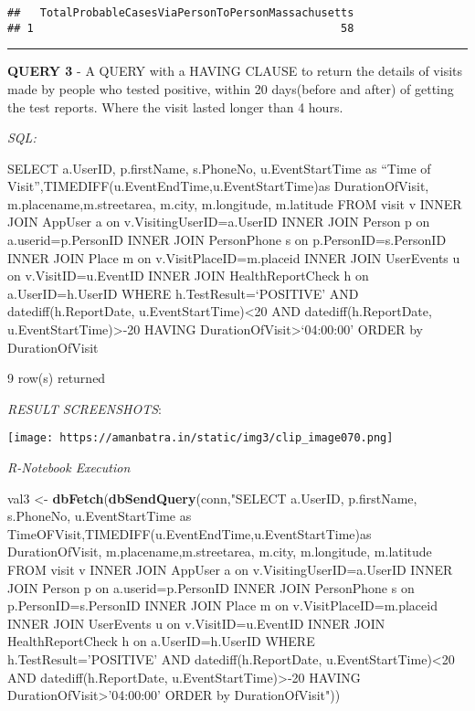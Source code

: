 \documentclass[
]{article}
\newenvironment{Shaded}{\begin{snugshade}}{\end{snugshade}}
\newcommand{\KeywordTok}[1]{\textcolor[rgb]{0.13,0.29,0.53}{\textbf{#1}}}
\newcommand{\NormalTok}[1]{#1}
\newcommand{\StringTok}[1]{\textcolor[rgb]{0.31,0.60,0.02}{#1}}
\begin{document}
\begin{verbatim}
##   TotalProbableCasesViaPersonToPersonMassachusetts
## 1                                               58
\end{verbatim}

\begin{center}\rule{0.5\linewidth}{0.5pt}\end{center}

\textbf{QUERY 3} - A QUERY with a HAVING CLAUSE to return the details of
visits made by people who tested positive, within 20 days(before and
after) of getting the test reports. Where the visit lasted longer than 4
hours.

\emph{SQL:}

SELECT a.UserID, p.firstName, s.PhoneNo, u.EventStartTime as ``Time of
Visit'',TIMEDIFF(u.EventEndTime,u.EventStartTime)as DurationOfVisit,
m.placename,m.streetarea, m.city, m.longitude, m.latitude FROM visit v
INNER JOIN AppUser a on v.VisitingUserID=a.UserID INNER JOIN Person p on
a.userid=p.PersonID INNER JOIN PersonPhone s on p.PersonID=s.PersonID
INNER JOIN Place m on v.VisitPlaceID=m.placeid INNER JOIN UserEvents u
on v.VisitID=u.EventID INNER JOIN HealthReportCheck h on
a.UserID=h.UserID WHERE h.TestResult=`POSITIVE' AND
datediff(h.ReportDate, u.EventStartTime)\textless20 AND
datediff(h.ReportDate, u.EventStartTime)\textgreater-20 HAVING
DurationOfVisit\textgreater{}`04:00:00' ORDER by DurationOfVisit

9 row(s) returned

\emph{RESULT SCREENSHOTS}:

\texttt{[image: https://amanbatra.in/static/img3/clip\_image070.png]}

\emph{R-Notebook Execution}

\begin{Shaded}
\begin{Highlighting}[]
\NormalTok{val3 <-}\StringTok{ }\KeywordTok{dbFetch}\NormalTok{(}\KeywordTok{dbSendQuery}\NormalTok{(conn,}\StringTok{"SELECT a.UserID, p.firstName, s.PhoneNo, u.EventStartTime as TimeOFVisit,TIMEDIFF(u.EventEndTime,u.EventStartTime)as DurationOfVisit, m.placename,m.streetarea, m.city, m.longitude, m.latitude  FROM visit v}
\StringTok{INNER JOIN AppUser a on v.VisitingUserID=a.UserID}
\StringTok{INNER JOIN Person p on a.userid=p.PersonID}
\StringTok{INNER JOIN PersonPhone s on p.PersonID=s.PersonID}
\StringTok{INNER JOIN Place m on v.VisitPlaceID=m.placeid}
\StringTok{INNER JOIN UserEvents u on v.VisitID=u.EventID}
\StringTok{INNER JOIN HealthReportCheck h on a.UserID=h.UserID}
\StringTok{WHERE h.TestResult='POSITIVE'}
\StringTok{AND datediff(h.ReportDate, u.EventStartTime)<20 }
\StringTok{AND datediff(h.ReportDate, u.EventStartTime)>-20}
\StringTok{HAVING DurationOfVisit>'04:00:00'}
\StringTok{ORDER by DurationOfVisit"}\NormalTok{))}
\end{Highlighting}
\end{Shaded}
\end{document}
